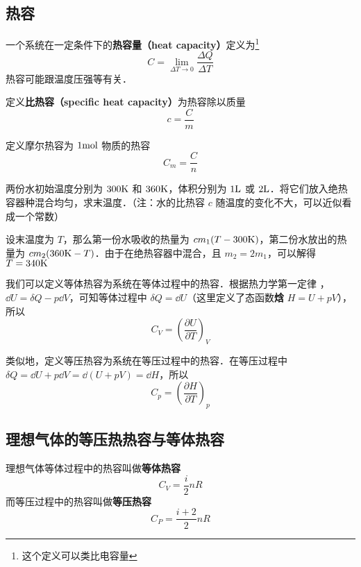 
\begin{issues}
\issueTODO
\end{issues}

\subsection{热容}
一个系统在一定条件下的\textbf{热容量（heat capacity）}定义为\footnote{这个定义可以类比电容量}
\begin{equation}
C = \lim\limits_{\Delta T\rightarrow 0}\frac{\Delta Q}{\Delta T}
\end{equation}
热容可能跟温度压强等有关．

定义\textbf{比热容（specific heat capacity）}为热容除以质量
\begin{equation}
c = \frac{C}{m}
\end{equation}

定义摩尔热容为 $1 \rm{mol}$ 物质的热容
\begin{equation}
C_m=\frac{C}{n}
\end{equation}

\begin{example}{}
两份水初始温度分别为 $300\rm{K}$ 和 $360\rm{K}$，体积分别为 $1\rm{L}$ 或 $2 \rm{L}$．将它们放入绝热容器种混合均匀，求末温度．（注：水的比热容 $c$ 随温度的变化不大，可以近似看成一个常数）

设末温度为 $T$，那么第一份水吸收的热量为 $c m_1(T-300\rm{K})$，第二份水放出的热量为 $cm_2(360{\rm{K}}-T)$．由于在绝热容器中混合，且 $m_2=2m_1$，可以解得 $T=340\rm{K}$
\end{example}

我们可以定义等体热容为系统在等体过程中的热容．根据热力学第一定律 ，$\dd U=\delta Q-p\dd V$，可知等体过程中 $\delta Q=\dd U$（这里定义了态函数\textbf{焓} $H=U+pV$），所以
\begin{equation}
C_V=\left(\frac{\partial U}{\partial T}\right)_V
\end{equation}

类似地，定义等压热容为系统在等压过程中的热容．在等压过程中 $\delta Q=\dd U+p\dd V=\dd (U+pV)=\dd H$，所以
\begin{equation}
C_p=\left(\frac{\partial H}{\partial T}\right)_p
\end{equation}

\subsection{理想气体的等压热热容与等体热容}
理想气体等体过程中的热容叫做\textbf{等体热容}
\begin{equation}\label{ThCapa_eq1}
C_V = \frac{i}{2} n R
\end{equation}
而等压过程中的热容叫做\textbf{等压热容}
\begin{equation}\label{ThCapa_eq2}
C_P = \frac{i+2}{2} n R
\end{equation}

